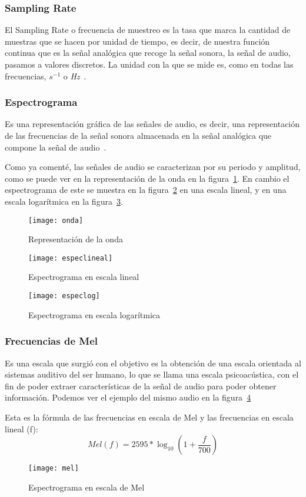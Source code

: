 \subsubsection{Sampling Rate}
El Sampling Rate o frecuencia de muestreo es la tasa que marca la cantidad de muestras que se hacen por unidad de tiempo, es decir, de nuestra función continua que es la señal analógica que recoge la señal sonora, la señal de audio, pasamos a valores discretos. La unidad con la que se mide es, como en todas las frecuencias, $s^{-1}$ o \textit{Hz}~\cite{wiki:sampling}.
\subsubsection{Espectrograma}
Es una representación gráfica de las señales de audio, es decir, una representación de las frecuencias de la señal sonora almacenada en la señal analógica que compone la señal de audio~\cite{wiki:espec}.

Como ya comenté, las señales de audio se caracterizan por su periodo y amplitud, como se puede ver en la representación de la onda en la figura~\ref{fig:onda}. En cambio el espectrograma de este se muestra en la figura~\ref{fig:espec} en una escala lineal, y en una escala logarítmica en la figura~\ref{fig:especlog}.
\begin{figure}
	\centering
	\texttt{[image: onda]}
	\caption{Representación de la onda}
	\label{fig:onda}
\end{figure}
\begin{figure}
	\centering
	\texttt{[image: especlineal]}
	\caption{Espectrograma en escala lineal}
	\label{fig:espec}
\end{figure}
\begin{figure}
	\centering
	\texttt{[image: especlog]}
	\caption{Espectrograma en escala logarítmica}
	\label{fig:especlog}
\end{figure}
\subsubsection{Frecuencias de Mel}
Es una escala que surgió con el objetivo es la obtención de una escala orientada al sistemas auditivo del ser humano, lo que se llama una escala psicoacústica, con el fin de poder extraer características de la señal de audio para poder obtener información. Podemos ver el ejemplo del mismo audio en la figura~\ref{fig:mel}

Esta es la fórmula de las frecuencias en escala de Mel y las frecuencias en escala lineal (f)\cite{wiki:mel,villa2012automatic}: \[ Mel(f) = 2595 * \log_{10}(1+\frac{f}{700})\]
\begin{figure}
	\centering
	\texttt{[image: mel]}
	\caption{Espectrograma en escala de Mel}
	\label{fig:mel}
\end{figure}
